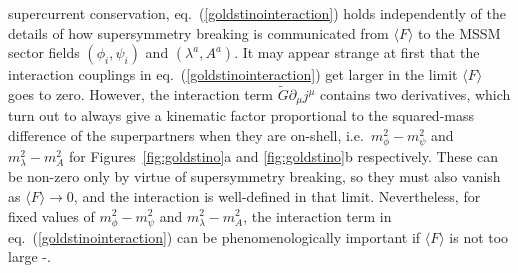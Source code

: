 \documentclass[12pt]{article}
\def\stilde{\widetilde}
\begin{document}
%
supercurrent conservation, eq.~(\ref{goldstinointeraction}) holds
independently of the details of how supersymmetry breaking is communicated
from $\langle F \rangle$ to the MSSM sector fields $(\phi_i,\psi_i)$ and
$(\lambda^a, A^a)$. It may appear strange at first that the interaction
couplings in eq.~(\ref{goldstinointeraction}) get larger in the limit
$\langle F \rangle$ goes to zero. However, the interaction term $\stilde G
\partial_\mu j^\mu$ contains two derivatives, which turn out to always
give a kinematic factor proportional to the squared-mass difference of the
superpartners when they are on-shell, i.e.~$m_{\phi}^2 - m_{\psi}^2$
and $m^2_{\lambda} - m_{A}^2$ for Figures~\ref{fig:goldstino}a and
\ref{fig:goldstino}b respectively. These can be non-zero only by virtue of
supersymmetry breaking, so they must also vanish as $\langle F\rangle
\rightarrow 0$, and the interaction is well-defined in that limit.
Nevertheless, for fixed values of $m_{\phi}^2 - m_{\psi}^2$ and
$m^2_{\lambda} - m_{A}^2$, the interaction term in
eq.~(\ref{goldstinointeraction}) can be phenomenologically important if
$\langle F \rangle $ is not too large
\cite{Fayetsupercurrent}-\cite{AKKMM2}.
\end{document}
